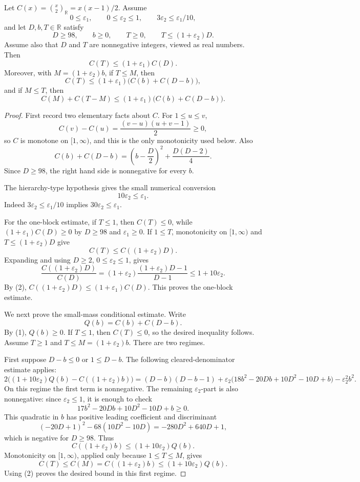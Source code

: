 \begin{lemma}
Let \(C(x)=\binom{x}{2}_{\mathbb R}=x(x-1)/2\).  Assume
\[
0\le\varepsilon_1,\qquad 0\le\varepsilon_2\le1,\qquad
3\varepsilon_2\le\varepsilon_1/10,
\]
and let \(D,b,T\in\mathbb R\) satisfy
\[
D\ge98,\qquad b\ge0,\qquad T\ge0,\qquad
T\le(1+\varepsilon_2)D.
\]
Assume also that \(D\) and \(T\) are nonnegative integers, viewed as real
numbers.
Then
\[
C(T)\le(1+\varepsilon_1)C(D).
\]
Moreover, with \(M=(1+\varepsilon_2)b\), if \(T\le M\), then
\[
C(T)\le(1+\varepsilon_1)\bigl(C(b)+C(D-b)\bigr),
\]
and if \(M\le T\), then
\[
C(M)+C(T-M)
\le
(1+\varepsilon_1)\bigl(C(b)+C(D-b)\bigr).
\]
\end{lemma}
\begin{proof}
First record two elementary facts about \(C\).  For \(1\le u\le v\),
\[
C(v)-C(u)=\frac{(v-u)(u+v-1)}2\ge0,
\]
so \(C\) is monotone on \([1,\infty)\), and this is the only monotonicity
used below.  Also
\[
C(b)+C(D-b)
=\left(b-\frac D2\right)^2+\frac{D(D-2)}4. \tag{1}
\]
Since \(D\ge98\), the right hand side is nonnegative for every \(b\).

The hierarchy-type hypothesis gives the small numerical conversion
\[
10\varepsilon_2\le\varepsilon_1. \tag{2}
\]
Indeed \(3\varepsilon_2\le\varepsilon_1/10\) implies
\(30\varepsilon_2\le\varepsilon_1\).

For the one-block estimate, if \(T\le1\), then \(C(T)\le0\), while
\((1+\varepsilon_1)C(D)\ge0\) by \(D\ge98\) and \(\varepsilon_1\ge0\).  If
\(1\le T\), monotonicity on \([1,\infty)\) and
\(T\le(1+\varepsilon_2)D\) give
\[
C(T)\le C((1+\varepsilon_2)D).
\]
Expanding and using \(D\ge2\), \(0\le\varepsilon_2\le1\), gives
\[
\frac{C((1+\varepsilon_2)D)}{C(D)}
=(1+\varepsilon_2)
  \frac{(1+\varepsilon_2)D-1}{D-1}
\le 1+10\varepsilon_2.
\]
By (2), \(C((1+\varepsilon_2)D)\le(1+\varepsilon_1)C(D)\).  This proves the
one-block estimate.

We next prove the small-mass conditional estimate.  Write
\[
Q(b)=C(b)+C(D-b).
\]
By (1), \(Q(b)\ge0\).  If \(T\le1\), then \(C(T)\le0\), so the desired
inequality follows.  Assume \(T\ge1\) and \(T\le M=(1+\varepsilon_2)b\).
There are two regimes.

First suppose \(D-b\le0\) or \(1\le D-b\).  The following
cleared-denominator estimate applies:
\[
2\bigl((1+10\varepsilon_2)Q(b)-C((1+\varepsilon_2)b)\bigr)
 =
(D-b)(D-b-1)+
\varepsilon_2\bigl(18b^2-20Db+10D^2-10D+b\bigr)
-\varepsilon_2^2b^2. \tag{3}
\]
On this regime the first term is nonnegative.  The remaining
\(\varepsilon_2\)-part is also nonnegative: since \(\varepsilon_2\le1\), it
is enough to check
\[
17b^2-20Db+10D^2-10D+b\ge0.
\]
This quadratic in \(b\) has positive leading coefficient and discriminant
\[
(-20D+1)^2-68(10D^2-10D)=-280D^2+640D+1,
\]
which is negative for \(D\ge98\).  Thus
\[
C((1+\varepsilon_2)b)
\le(1+10\varepsilon_2)Q(b). \tag{4}
\]
Monotonicity on \([1,\infty)\), applied only because \(1\le T\le M\), gives
\[
C(T)\le C(M)=C((1+\varepsilon_2)b)\le(1+10\varepsilon_2)Q(b).
\]
Using (2) proves the desired bound in this first regime.


\end{proof}
